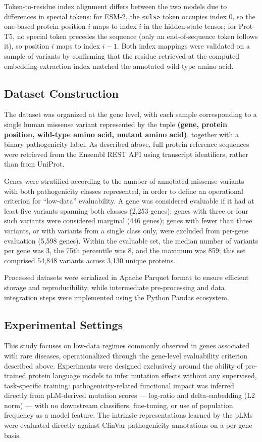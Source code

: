 \documentclass[12pt]{article}
\begin{document}
Token-to-residue index alignment differs between the two models due to differences in special tokens: for ESM-2, the \texttt{<cls>} token occupies index 0, so the one-based protein position $i$ maps to index $i$ in the hidden-state tensor; for Prot-T5, no special token precedes the sequence (only an end-of-sequence token follows it), so position $i$ maps to index $i - 1$. Both index mappings were validated on a sample of variants by confirming that the residue retrieved at the computed embedding-extraction index matched the annotated wild-type amino acid.

\subsection{Dataset Construction}
\label{sec:dataset}

The dataset was organized at the gene level, with each sample corresponding to a single human missense variant represented by the tuple \textbf{(gene, protein position, wild-type amino acid, mutant amino acid)}, together with a binary pathogenicity label. As described above, full protein reference sequences were retrieved from the Ensembl REST API \cite{ensembl} using transcript identifiers, rather than from UniProt.

Genes were stratified according to the number of annotated missense variants with both pathogenicity classes represented, in order to define an operational criterion for ``low-data'' evaluability. A gene was considered evaluable if it had at least five variants spanning both classes (2,253 genes); genes with three or four such variants were considered marginal (446 genes); genes with fewer than three variants, or with variants from a single class only, were excluded from per-gene evaluation (5,598 genes). Within the evaluable set, the median number of variants per gene was 3, the 75th percentile was 8, and the maximum was 859; this set comprised 54,848 variants across 3,130 unique proteins.

Processed datasets were serialized in Apache Parquet format to ensure efficient storage and reproducibility, while intermediate pre-processing and data integration steps were implemented using the Python Pandas ecosystem.

\subsection{Experimental Settings}

This study focuses on low-data regimes commonly observed in genes associated with rare diseases, operationalized through the gene-level evaluability criterion described above. Experiments were designed exclusively around the ability of pre-trained protein language models to infer mutation effects without any supervised, task-specific training: pathogenicity-related functional impact was inferred directly from pLM-derived mutation scores --- log-ratio and delta-embedding (L2 norm) --- with no downstream classifiers, fine-tuning, or use of population frequency as a model feature. The intrinsic representations learned by the pLMs were evaluated directly against ClinVar pathogenicity annotations on a per-gene basis.
\end{document}
